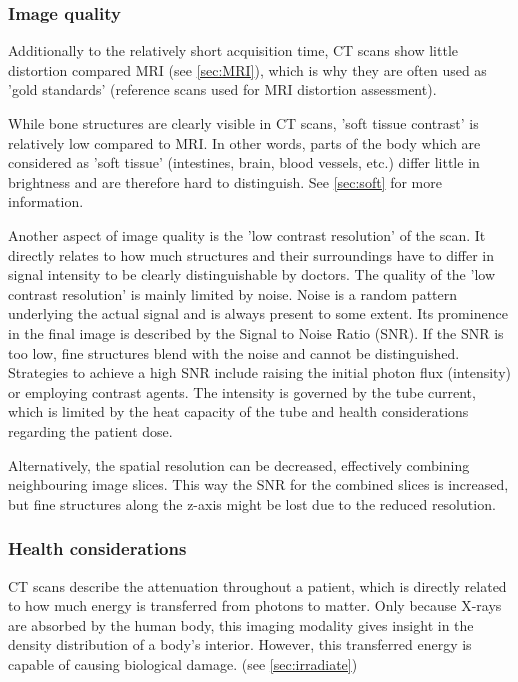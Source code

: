 \subsubsection{Image quality} %
Additionally to the relatively short acquisition time, CT scans show little distortion compared MRI (see \ref{sec:MRI}), which is why they are often used as 'gold standards' (reference scans used for MRI distortion assessment).

While bone structures are clearly visible in CT scans, 'soft tissue contrast' is relatively low compared to MRI.
In other words, parts of the body which are considered as 'soft tissue' (intestines, brain, blood vessels, etc.) differ little in brightness and are therefore hard to distinguish.
See \ref{sec:soft} for more information.

Another aspect of image quality is the 'low contrast resolution' of the scan.
It directly relates to how much structures and their surroundings have to differ in signal intensity to be clearly distinguishable by doctors.
The quality of the 'low contrast resolution' is mainly limited by noise.
Noise is a random pattern underlying the actual signal and is always present to some extent.
Its prominence in the final image is described by the Signal to Noise Ratio (SNR).
If the SNR is too low, fine structures blend with the noise and cannot be distinguished. 
Strategies to achieve a high SNR include raising the initial photon flux (intensity) or employing contrast agents.
The intensity is governed by the tube current, which is limited by the heat capacity of the tube and health considerations regarding the patient dose.

Alternatively, the spatial resolution can be decreased, effectively combining neighbouring image slices.
This way the SNR for the combined slices is increased, but fine structures along the z-axis might be lost due to the reduced resolution. \cite{Podgorsak, Maidment2014}

\subsubsection{Health considerations}
CT scans describe the attenuation throughout a patient, which is directly related to how much energy is transferred from photons to matter.
Only because X-rays are absorbed by the human body, this imaging modality gives insight in the density distribution of a body's interior.
However, this transferred energy is capable of causing biological damage. (see \ref{sec:irradiate})


